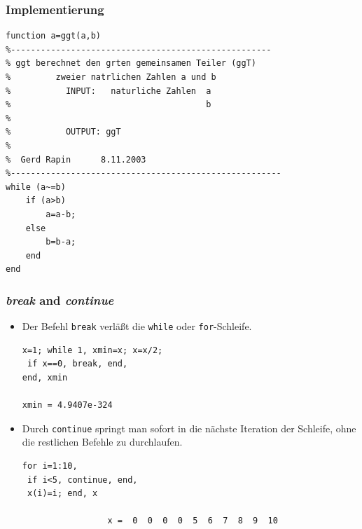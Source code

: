 \begin{frame}[fragile]\frametitle{Implementierung}
\begin{lstlisting}
function a=ggt(a,b)
%----------------------------------------------------
% ggt berechnet den grten gemeinsamen Teiler (ggT)    
%         zweier natrlichen Zahlen a und b
%           INPUT:   naturliche Zahlen  a
%                                       b
%                 
%           OUTPUT: ggT
%                   
%  Gerd Rapin      8.11.2003
%------------------------------------------------------
while (a~=b)
    if (a>b)
        a=a-b;
    else
        b=b-a;
    end
end
\end{lstlisting}
\end{frame}
%
%
%
\begin{frame}[fragile]\frametitle{{\it break} and {\it continue}}
\begin{itemize}
\item  Der Befehl \lstinline!break! verläßt die \lstinline!while! oder
  \lstinline!for!-Schleife.
\begin{lstlisting}
x=1; while 1, xmin=x; x=x/2;
 if x==0, break, end,
end, xmin

xmin = 4.9407e-324
\end{lstlisting} 
\item  Durch \lstinline!continue! springt man sofort in die
  nächste Iteration der Schleife, ohne die restlichen Befehle zu
  durchlaufen.
\vspace*{-0.5cm}\\
\begin{lstlisting}
for i=1:10,
 if i<5, continue, end,
 x(i)=i; end, x

                 x =  0  0  0  0  5  6  7  8  9  10
\end{lstlisting}
\end{itemize}
\end{frame}

